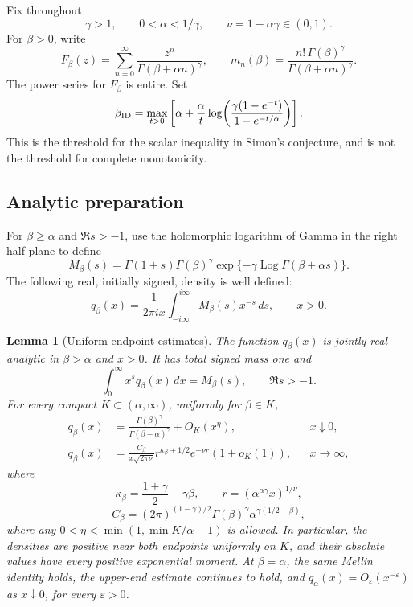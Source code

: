 \documentclass[11pt,a4paper]{article}
\newtheorem{lemma}[theorem]{Lemma}
\theoremstyle{definition}
\theoremstyle{remark}
\numberwithin{equation}{section}
\begin{document}
Fix throughout
\[
 \gamma>1,\qquad 0<\alpha<1/\gamma,\qquad \nu=1-\alpha\gamma\in(0,1).
\]
For \(\beta>0\), write
\[
 F_\beta(z)=\sum_{n=0}^{\infty}
             \frac{z^n}{\Gamma(\beta+\alpha n)^\gamma},
 \qquad
 m_n(\beta)=\frac{n!\,\Gamma(\beta)^\gamma}
                   {\Gamma(\beta+\alpha n)^\gamma}.
\]
The power series for \(F_\beta\) is entire.  Set
\begin{equation}\label{spec:ID-boundary}
 \beta_{\rm ID}=\max_{t>0}
 \left[\alpha+\frac{\alpha}{t}
  \log\!\left(\frac{\gamma(1-e^{-t})}{1-e^{-t/\alpha}}\right)\right].
\end{equation}
This is the threshold for the scalar inequality in Simon's conjecture,
and is not the threshold for complete monotonicity.

\subsection{Analytic preparation}

For \(\beta\ge\alpha\) and \(\Re s>-1\), use the holomorphic logarithm
of Gamma in the right half-plane to define
\[
 M_\beta(s)=\Gamma(1+s)\Gamma(\beta)^\gamma
       \exp\{-\gamma\operatorname{Log}\Gamma(\beta+\alpha s)\}.
\]
The following real, initially signed, density is well defined:
\begin{equation}\label{spec:q}
 q_\beta(x)=\frac{1}{2\pi i x}
       \int_{-i\infty}^{i\infty}M_\beta(s)x^{-s}\,ds,
 \qquad x>0.
\end{equation}

\begin{lemma}[Uniform endpoint estimates]\label{spec:endpoints}
The function \(q_\beta(x)\) is jointly real analytic in
\(\beta>\alpha\) and \(x>0\).  It has total signed mass one and
\begin{equation}\label{spec:mellin}
 \int_0^\infty x^s q_\beta(x)\,dx=M_\beta(s),\qquad \Re s>-1.
\end{equation}
For every compact \(K\subset(\alpha,\infty)\), uniformly for \(\beta\in K\),
\begin{align}
 q_\beta(x)&=\frac{\Gamma(\beta)^\gamma}
                   {\Gamma(\beta-\alpha)^\gamma}+O_K(x^\eta),
                   &&x\downarrow0,\label{spec:zero-tail}\\
 q_\beta(x)&=\frac{C_\beta}{x\sqrt{2\pi\nu}}
           r^{\kappa_\beta+1/2}e^{-\nu r}(1+o_K(1)),
                   &&x\to\infty,\label{spec:infty-tail}
\end{align}
where
\[
 \kappa_\beta=\frac{1+\gamma}{2}-\gamma\beta,
 \qquad r=(\alpha^{\alpha\gamma}x)^{1/\nu},
\]
\[
 C_\beta=(2\pi)^{(1-\gamma)/2}\Gamma(\beta)^\gamma
                       \alpha^{\gamma(1/2-\beta)},
\]
where any \(0<\eta<\min(1,\min K/\alpha-1)\) is allowed.
In particular, the densities are positive near both endpoints uniformly
on \(K\), and their absolute values have every positive exponential moment.
At \(\beta=\alpha\), the same Mellin identity holds, the upper-end estimate
continues to hold, and \(q_\alpha(x)=O_\varepsilon(x^{-\varepsilon})\)
as \(x\downarrow0\), for every \(\varepsilon>0\).
\end{lemma}
\end{document}
